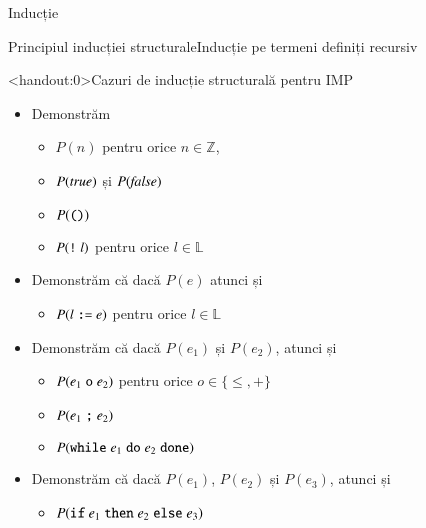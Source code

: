 \documentclass[xcolor=pdftex,romanian,colorlinks,handout]{beamer}
\begin{document}
\begin{section}{Inducție}
\begin{frame}{Principiul inducției structurale}{Inducție pe termeni definiți recursiv}
\end{frame}

\begin{frame}<handout:0>{Cazuri de inducție structurală pentru IMP}
\begin{itemize}
\item[]  
Demonstrăm
\begin{itemize}
\item $P(n)$ pentru orice $n \in \mathbb{Z}$,
\item $P({\it true})$ și $P({\it false})$
\item $P(\mathrel{\text{\ttfamily ()}})$
\item$P(\mathrel{\text{\ttfamily !}} l)$ pentru orice $l\in \mathbb{L}$
\end{itemize}

\item[]   
Demonstrăm că dacă $P(e)$ atunci și
\begin{itemize}
\item $P(l \mathrel{\text{\ttfamily :=}} e)$ pentru orice $l \in \mathbb{L}$
\end{itemize}
\item[] 
Demonstrăm că dacă $P(e_1)$ și $P(e_2)$, atunci și
\begin{itemize}
\item $P(e_1 \mathrel{\text{\ttfamily o}} e_2)$ pentru orice $o \in \{\leq, +\}$
\item $P(e_1 \mathrel{\text{\ttfamily ;}} e_2)$
\item $P(\mathrel{\text{\ttfamily while}} e_1 \mathrel{\text{\ttfamily do}} e_2 \mathrel{\text{\ttfamily done}})$ 
\end{itemize}
\item[]
Demonstrăm că dacă $P(e_1)$, $P(e_2)$ și $P(e_3)$, atunci și 
\begin{itemize}
\item $P(\mathrel{\text{\ttfamily if}} e_1 \mathrel{\text{\ttfamily then}} e_2 \mathrel{\text{\ttfamily else}} e_3)$ 
\end{itemize}
\end{itemize}
\end{frame}

\end{section}
\end{document}
